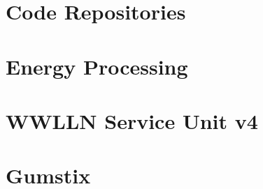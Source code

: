 \documentclass [11pt, twoside] {uwthesis}[2012/06/19]
\begin{document}
%
%

\appendix
\raggedbottom\sloppy
 

\chapter{Code Repositories}
\label{thesis:appendix:code}




\chapter{Energy Processing}
\label{thesis:appendix:energy}




\chapter{WWLLN Service Unit v4}
\label{thesis:appendix:su}




\chapter{Gumstix}
\label{thesis:appendix:gumstix}



\end{document}
